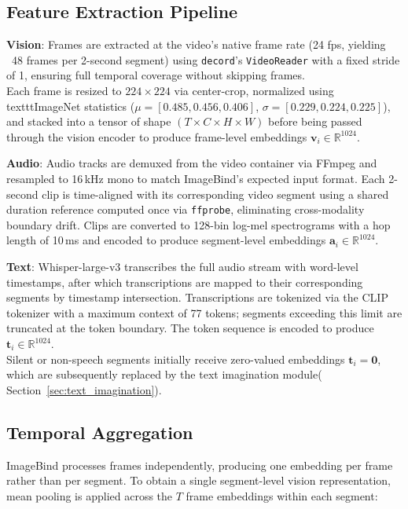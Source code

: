 \documentclass[12pt,a4paper,oneside,english]{book}
\begin{document}
\subsection{Feature Extraction Pipeline}
\label{subsec:feature_extraction}

\medskip %
\indent \textbf{Vision}: Frames are extracted at the video's native frame rate (24 fps, yielding ~48 frames per 2-second segment) using \texttt{decord}'s \texttt{VideoReader} with a fixed stride of 1, ensuring full temporal coverage without skipping frames. 
\\Each frame is resized to $224\times224$ via center-crop, normalized using texttt{ImageNet} statistics ($\mu = [0.485, 0.456, 0.406]$, $\sigma = [0.229, 0.224, 0.225]$), and stacked into a tensor of shape $(T \times C \times H \times W)$  
before being passed through the vision encoder to produce frame-level embeddings $\mathbf{v}_i \in \mathbb{R}^{1024}$.

\textbf{Audio}: Audio tracks are demuxed from the video container via FFmpeg and resampled to 16\,kHz mono to match ImageBind's expected input format.
Each 2-second clip is time-aligned with its corresponding video segment using a shared duration reference computed once via \texttt{ffprobe}, eliminating cross-modality boundary drift.
Clips are converted to 128-bin log-mel spectrograms with a hop length of 10\,ms and encoded to produce segment-level embeddings $\mathbf{a}_i \in \mathbb{R}^{1024}$.

\textbf{Text}: Whisper-large-v3 transcribes the full audio stream with word-level timestamps, after which transcriptions are mapped to their corresponding segments by timestamp intersection.
Transcriptions are tokenized via the CLIP tokenizer with a maximum context of 77 tokens; segments exceeding this limit are truncated at the token boundary. The token sequence is encoded to produce $\mathbf{t}_i \in \mathbb{R}^{1024}$.
\\Silent or non-speech segments initially receive zero-valued embeddings $\mathbf{t}_i = \mathbf{0}$, which are subsequently replaced by the text imagination module( Section~\ref{sec:text_imagination}).

\subsection{Temporal Aggregation}
\label{subsec:temporal_aggregation}
ImageBind processes frames independently, producing one embedding per frame rather than per segment. To obtain a single segment-level vision representation, mean pooling is applied across the $T$ frame embeddings within each segment:
\end{document}
